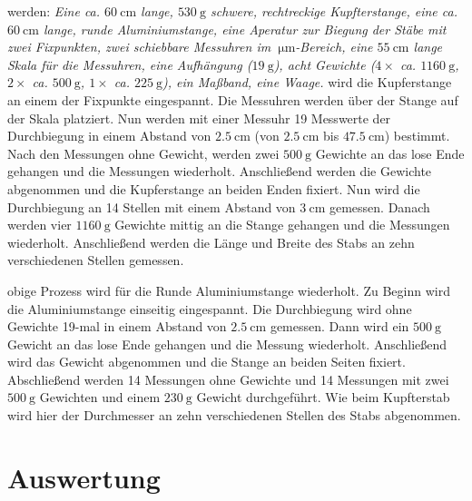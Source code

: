 \justifying werden: \textit{ Eine ca. $\SI{60}{\centi\meter}$ lange, $\SI{530}{\gram}$ schwere, rechtreckige Kupfterstange, eine ca. $\SI{60}{\centi\meter}$ lange, runde
Aluminiumstange, eine Aperatur zur Biegung der Stäbe mit zwei Fixpunkten, zwei schiebbare Messuhren im $\SI{}{\micro\meter}$-Bereich, eine
$\SI{55}{\centi\meter}$ lange Skala für die Messuhren, eine Aufhängung ($\SI{19}{\gram}$), acht Gewichte ($4\times$ ca. $\SI{1160}{\gram}$, 
$2\times$ ca. $\SI{500}{\gram}$, $1\times$ ca. $\SI{225}{\gram}$), ein Maßband, eine Waage.
}
\justifying wird die Kupferstange an einem der Fixpunkte eingespannt. Die Messuhren werden über der Stange auf der Skala platziert. Nun werden mit 
einer Messuhr 19 Messwerte der Durchbiegung in einem Abstand von $\SI{2.5}{\centi\meter}$ (von $\SI{2.5}{\centi\meter}$ bis $\SI{47.5}{\centi\meter}$) 
bestimmt. Nach den Messungen ohne Gewicht, werden zwei $\SI{500}{\gram}$ Gewichte an das lose Ende gehangen und die Messungen wiederholt. Anschließend
werden die Gewichte abgenommen und die Kupferstange an beiden Enden fixiert. Nun wird die Durchbiegung an 14 Stellen mit einem Abstand von 
$\SI{3}{\centi\meter}$ gemessen. Danach werden vier $\SI{1160}{\gram}$ Gewichte mittig an die Stange gehangen und die Messungen wiederholt. 
Anschließend werden die Länge und Breite des Stabs an zehn verschiedenen Stellen gemessen.

\justifying obige Prozess wird für die Runde Aluminiumstange wiederholt. Zu Beginn wird die Aluminiumstange einseitig eingespannt. Die Durchbiegung
wird ohne Gewichte 19-mal in einem Abstand von $\SI{2.5}{\centi\meter}$ gemessen. Dann wird ein $\SI{500}{\gram}$ Gewicht an das lose Ende 
gehangen und die Messung wiederholt. Anschließend wird das Gewicht abgenommen und die Stange an beiden Seiten fixiert. Abschließend werden 
14 Messungen ohne Gewichte und 14 Messungen mit zwei $\SI{500}{\gram}$ Gewichten und einem $\SI{230}{\gram}$ Gewicht durchgeführt. Wie beim Kupfterstab
wird hier der Durchmesser an zehn verschiedenen Stellen des Stabs abgenommen.


\section{Auswertung}\justifying



